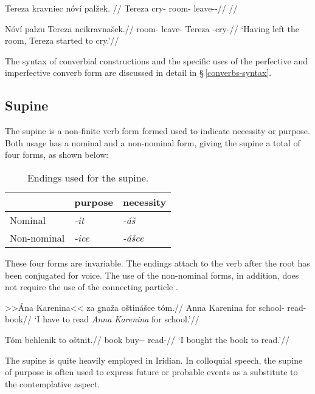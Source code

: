 \pex
\begingl
\gla Tereza kravniec nóví palžek. //
\glb Tereza cry- room-\Gen{} leave-\Av{}-\Pf{}//
\glft {}//
\endgl
\xe

\pex
\begingl
\gla Nóví palzu Tereza neikravnašek.//
\glb room-\Gen{} leave- Tereza -cry-//
\glft `Having left the room, Tereza started to cry.'//
\endgl
\xe

The syntax of converbial constructions and the specific uses of the perfective and imperfective converb form are discussed in detail in \S\,\ref{converbs-syntax}.


\subsection{Supine}

The {\sc supine} is a non-finite verb form formed used to indicate necessity or purpose. Both usage has a nominal and a non-nominal form, giving the supine a total of four forms, as shown below:

\begin{table}[h!]
	\small
	\caption{Endings used for the supine.}
	\medskip
	\begin{tabu} to 0.6\textwidth{YYY}
		\toprule
		&{\sc purpose}&{\sc necessity}\\
		\midrule
		Nominal & \textit{-it} & \textit{-áš}\\
		Non-nominal & \textit{-ice} & \textit{-ášce}\\
		\bottomrule
	\end{tabu}
\end{table}

These four forms are invariable. The endings attach to the verb after the root has been conjugated for voice. The use of the non-nominal forms, in addition, does not require the use of the connecting particle .

\pex
\a\begingl
\gla >>Ána Karenina<< za gnaža oštinášce tóm.//
\glb Anna Karenina for school-\Pat{} read- book//
\glft `I have to read \textit{Anna Karenina} for school.'//
\endgl

\a\begingl
\gla Tóm behlenik to oštnit.//
\glb book buy-\Pv{}-\Pf{}  read-//
\glft `I bought the book to read.'//
\endgl
\xe

The supine is quite heavily employed in Iridian. In colloquial speech, the supine of purpose is often used to express future or probable events as a substitute to the contemplative aspect.

